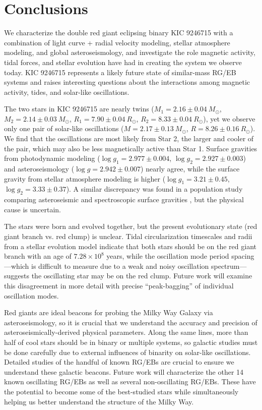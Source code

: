 \section{Conclusions}\label{conclude}
We characterize the double red giant eclipsing binary KIC 9246715 with a combination of light curve + radial velocity modeling, stellar atmosphere modeling, and global asteroseismology, and investigate the role magnetic activity, tidal forces, and stellar evolution have had in creating the system we observe today. KIC 9246715 represents a likely future state of similar-mass RG/EB systems and raises interesting questions about the interactions among magnetic activity, tides, and solar-like oscillations.

The two stars in KIC 9246715 are nearly twins ($M_1 = 2.16 \pm 0.04\ M_{\odot}$, $M_2 = 2.14 \pm 0.03\ M_{\odot}$, $R_1 = 7.90 \pm 0.04 \ R_{\odot}$, $R_2 = 8.33 \pm 0.04 \ R_{\odot}$), yet we observe only one pair of solar-like oscillations ($M = 2.17 \pm 0.13 \ M_{\odot}$, $R = 8.26 \pm 0.16 \ R_{\odot}$). We find that the oscillations are most likely from Star 2, the larger and cooler of the pair, which may also be less magnetically active than Star 1. Surface gravities from photodynamic modeling ($\log g_1 = 2.977 \pm 0.004$, $\log g_2 = 2.927 \pm 0.003$) and asteroseismology ($\log g = 2.942 \pm 0.007$) nearly agree, while the surface gravity from stellar atmosphere modeling is higher ($\log g_1 = 3.21 \pm 0.45$, $\log g_2 = 3.33 \pm 0.37$). A similar discrepancy was found in a population study comparing asteroseismic and spectroscopic surface gravities \citep{hol15}, but the physical cause is uncertain.

The stars were born and evolved together, but the present evolutionary state (red giant branch vs. red clump) is unclear. Tidal circularization timescales and radii from a stellar evolution model indicate that both stars should be on the red giant branch with an age of $7.28 \times 10^8$ years, while the oscillation mode period spacing---which is difficult to measure due to a weak and noisy oscillation spectrum---suggests the oscillating star may be on the red clump. Future work will examine this disagreement in more detail with precise ``peak-bagging'' of individual oscillation modes.

Red giants are ideal beacons for probing the Milky Way Galaxy via asteroseismology, so it is crucial that we understand the accuracy and precision of asteroseismically-derived physical parameters. Along the same lines, more than half of cool stars should be in binary or multiple systems, so galactic studies must be done carefully due to external influences of binarity on solar-like oscillations. Detailed studies of the handful of known RG/EBs are crucial to ensure we understand these galactic beacons. Future work will characterize the other 14 known oscillating RG/EBs as well as several non-oscillating RG/EBs. These have the potential to become some of the best-studied stars while simultaneously helping us better understand the structure of the Milky Way.
  
  
  
  
  
